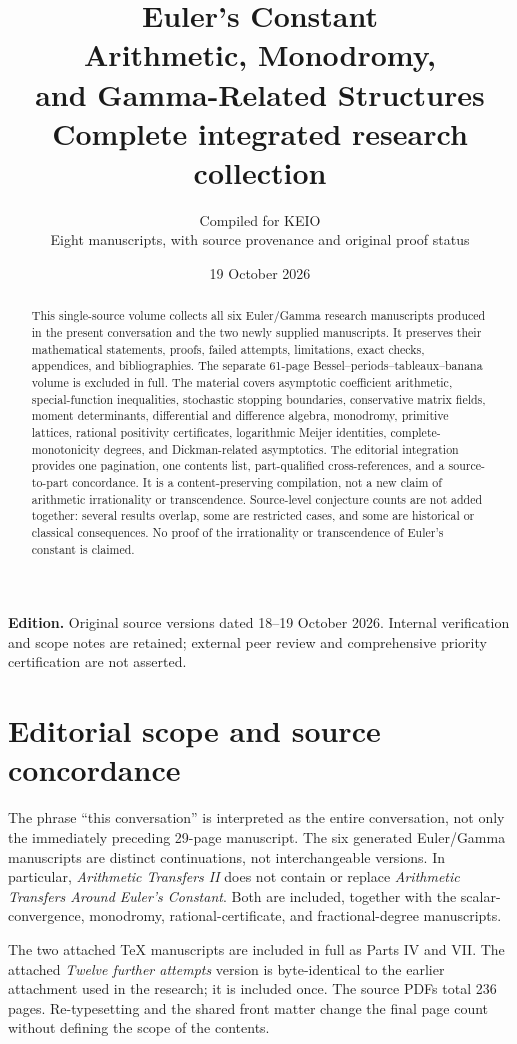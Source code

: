 \documentclass[11pt,a4paper]{article}
\title{\bfseries Euler's Constant\\[5pt]
 \Large Arithmetic, Monodromy,\\and Gamma-Related Structures\\[10pt]
 \large Complete integrated research collection}
\author{Compiled for KEIO\\\small Eight manuscripts, with source provenance and original proof status}
\date{19 October 2026}
\theoremstyle{definition}
\theoremstyle{remark}
\numberwithin{equation}{section}
\begin{document}
\maketitle
\begin{abstract}
This single-source volume collects all six Euler/Gamma research manuscripts
produced in the present conversation and the two newly supplied manuscripts.
It preserves their mathematical statements, proofs, failed attempts,
limitations, exact checks, appendices, and bibliographies. The separate
61-page Bessel--periods--tableaux--banana volume is excluded in full.
The material covers asymptotic coefficient arithmetic, special-function
inequalities, stochastic stopping boundaries, conservative matrix fields,
moment determinants, differential and difference algebra, monodromy,
primitive lattices, rational positivity certificates, logarithmic Meijer
identities, complete-monotonicity degrees, and Dickman-related asymptotics.
The editorial integration provides one pagination, one contents list,
part-qualified cross-references, and a source-to-part concordance.
It is a content-preserving compilation, not a new claim of arithmetic
irrationality or transcendence. Source-level conjecture counts are not added
together: several results overlap, some are restricted cases, and some are
historical or classical consequences. No proof of the irrationality or
transcendence of Euler's constant is claimed.
\end{abstract}
\bigskip
\noindent\textbf{Edition.} Original source versions dated 18--19 October 2026.
Internal verification and scope notes are retained; external peer review and
comprehensive priority certification are not asserted.
\clearpage
{}
\section*{Editorial scope and source concordance}
The phrase ``this conversation'' is interpreted as the entire conversation,
not only the immediately preceding 29-page manuscript. The six generated
Euler/Gamma manuscripts are distinct continuations, not interchangeable
versions. In particular, \emph{Arithmetic Transfers II} does not contain or
replace \emph{Arithmetic Transfers Around Euler's Constant}. Both are
included, together with the scalar-convergence, monodromy,
rational-certificate, and fractional-degree manuscripts.

The two attached TeX manuscripts are included in full as Parts IV and VII.
The attached \emph{Twelve further attempts} version is byte-identical to
the earlier attachment used in the research; it is included once.
The source PDFs total 236 pages. Re-typesetting and the shared front matter
change the final page count without defining the scope of the contents.
\end{document}
